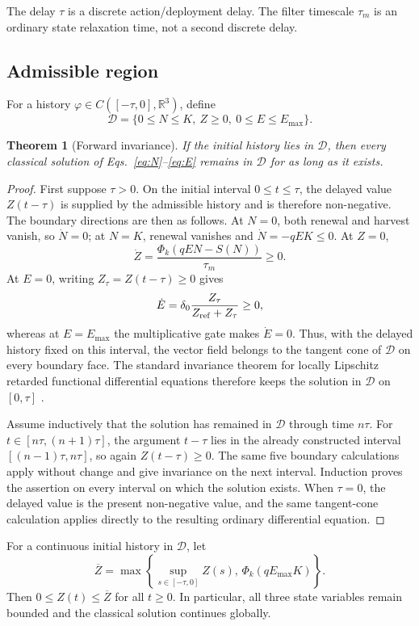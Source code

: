 \documentclass[11pt]{article}
\newtheorem{theorem}{Theorem}
\newcommand{\R}{\mathbb R}
\begin{document}
The delay $\tau$ is a discrete action/deployment delay. The filter timescale $\tau_m$ is an ordinary state relaxation time, not a second discrete delay.

\subsection{Admissible region}

For a history $\varphi\in C([ -\tau,0],\R^3)$, define
\[
\mathcal D=\{0\le N\le K,\ Z\ge0,\ 0\le E\le E_{\max}\}.
\]

\begin{theorem}[Forward invariance]
If the initial history lies in $\mathcal D$, then every classical solution of Eqs.~\eqref{eq:N}--\eqref{eq:E} remains in $\mathcal D$ for as long as it exists.
\end{theorem}

\begin{proof}
First suppose $\tau>0$. On the initial interval $0\le t\le\tau$, the delayed value $Z(t-\tau)$ is supplied by the admissible history and is therefore non-negative. The boundary directions are then as follows. At $N=0$, both renewal and harvest vanish, so $\dot N=0$; at $N=K$, renewal vanishes and $\dot N=-qEK\le0$. At $Z=0$,
\[
\dot Z=\frac{\Phi_k(qEN-S(N))}{\tau_m}\ge0.
\]
At $E=0$, writing $Z_\tau=Z(t-\tau)\ge0$ gives
\[
\dot E=\delta_0\frac{Z_\tau}{Z_{\rm ref}+Z_\tau}\ge0,
\]
whereas at $E=E_{\max}$ the multiplicative gate makes $\dot E=0$. Thus, with the delayed history fixed on this interval, the vector field belongs to the tangent cone of $\mathcal D$ on every boundary face. The standard invariance theorem for locally Lipschitz retarded functional differential equations therefore keeps the solution in $\mathcal D$ on $[0,\tau]$ \cite{hale1993}.

Assume inductively that the solution has remained in $\mathcal D$ through time $n\tau$. For $t\in[n\tau,(n+1)\tau]$, the argument $t-\tau$ lies in the already constructed interval $[(n-1)\tau,n\tau]$, so again $Z(t-\tau)\ge0$. The same five boundary calculations apply without change and give invariance on the next interval. Induction proves the assertion on every interval on which the solution exists. When $\tau=0$, the delayed value is the present non-negative value, and the same tangent-cone calculation applies directly to the resulting ordinary differential equation.
\end{proof}

\begin{corollary}
For a continuous initial history in $\mathcal D$, let
\[
\overline Z=\max\left\{\sup_{s\in[-\tau,0]}Z(s),\,\Phi_k(qE_{\max}K)\right\}.
\]
Then $0\le Z(t)\le\overline Z$ for all $t\ge0$. In particular, all three state variables remain bounded and the classical solution continues globally.
\end{corollary}
\end{document}

